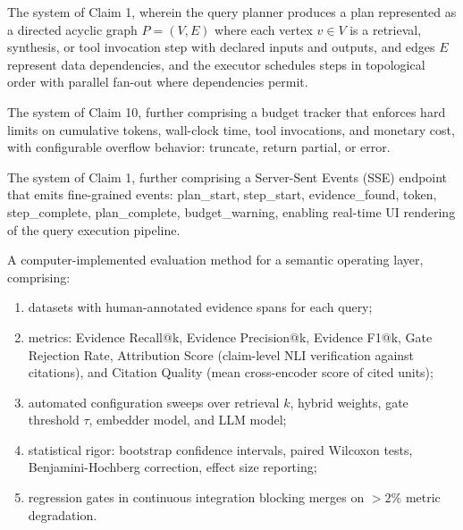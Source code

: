\begin{claim}
\label{claim:dag-planner}
The system of Claim 1, wherein the query planner produces a plan represented as a directed acyclic graph $P = (V, E)$ where each vertex $v \in V$ is a retrieval, synthesis, or tool invocation step with declared inputs and outputs, and edges $E$ represent data dependencies, and the executor schedules steps in topological order with parallel fan-out where dependencies permit.
\end{claim}

\begin{claim}
\label{claim:budget}
The system of Claim 10, further comprising a budget tracker that enforces hard limits on cumulative tokens, wall-clock time, tool invocations, and monetary cost, with configurable overflow behavior: truncate, return partial, or error.
\end{claim}

\begin{claim}
\label{claim:streaming}
The system of Claim 1, further comprising a Server-Sent Events (SSE) endpoint that emits fine-grained events: plan\_start, step\_start, evidence\_found, token, step\_complete, plan\_complete, budget\_warning, enabling real-time UI rendering of the query execution pipeline.
\end{claim}

\begin{claim}
\label{claim:eval}
A computer-implemented evaluation method for a semantic operating layer, comprising:
\begin{enumerate}
  \item datasets with human-annotated evidence spans for each query;
  \item metrics: Evidence Recall@k, Evidence Precision@k, Evidence F1@k, Gate Rejection Rate, Attribution Score (claim-level NLI verification against citations), and Citation Quality (mean cross-encoder score of cited units);
  \item automated configuration sweeps over retrieval $k$, hybrid weights, gate threshold $\tau$, embedder model, and LLM model;
  \item statistical rigor: bootstrap confidence intervals, paired Wilcoxon tests, Benjamini-Hochberg correction, effect size reporting;
  \item regression gates in continuous integration blocking merges on $>2\%$ metric degradation.
\end{enumerate}
\end{claim}

